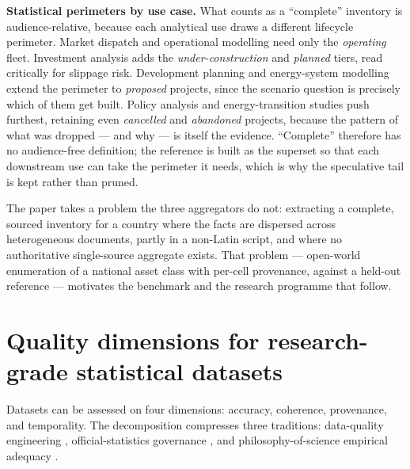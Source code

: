 \documentclass[a4paper,11pt]{article}
\begin{document}
\textbf{Statistical perimeters by use case.} What counts as a
``complete'' inventory is audience-relative, because each analytical use
draws a different lifecycle perimeter. Market dispatch and operational
modelling need only the \emph{operating} fleet. Investment analysis adds
the \emph{under-construction} and \emph{planned} tiers, read critically
for slippage risk. Development planning and energy-system modelling
extend the perimeter to \emph{proposed} projects, since the scenario
question is precisely which of them get built. Policy analysis and
energy-transition studies push furthest, retaining even \emph{cancelled}
and \emph{abandoned} projects, because the pattern of what was dropped
--- and why --- is itself the evidence. ``Complete'' therefore has no
audience-free definition; the reference is built as the superset so that
each downstream use can take the perimeter it needs, which is why the
speculative tail is kept rather than pruned.

The paper takes a problem the three aggregators do not: extracting a
complete, sourced inventory for a country where the facts are dispersed
across heterogeneous documents, partly in a non-Latin script, and where
no authoritative single-source aggregate exists. That problem ---
open-world enumeration of a national asset class with per-cell
provenance, against a held-out reference --- motivates the benchmark and
the research programme that follow.

\section{Quality dimensions for research-grade statistical
datasets}\label{sec:quality}

Datasets can be assessed on four dimensions: accuracy, coherence,
provenance, and temporality. The decomposition compresses three
traditions: data-quality engineering
\citep{Wang-Richard1996:beyond-accuracy}, official-statistics governance
\citep{IMF2003:dqaf, UN2014:fundamental-principles}, and
philosophy-of-science empirical adequacy
\citep{vanFraassen1980:scientific-image}.
\end{document}
